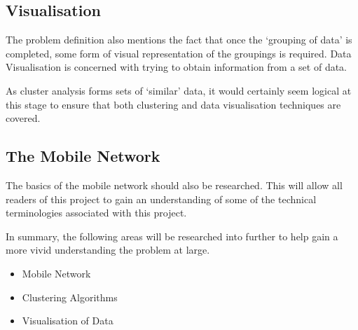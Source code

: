 \subsection{Visualisation}
The problem definition also mentions the fact that once the `grouping of data' 
is completed, some form of visual representation of the groupings is required. 
Data Visualisation is concerned with trying to obtain information from a set 
of data. 

As cluster analysis forms sets of `similar' data, it would certainly seem 
logical at this stage to ensure that both clustering and data visualisation 
techniques are covered.

\subsection{The Mobile Network}
The basics of the mobile network should also be researched. This will allow all
readers of this project to gain an understanding of some of the technical 
terminologies associated with this project.

In summary, the following areas will be researched into further to help gain a
more vivid understanding the problem at large.

\begin{itemize}
  \item Mobile Network
  \item Clustering Algorithms
  \item Visualisation of Data
\end{itemize}